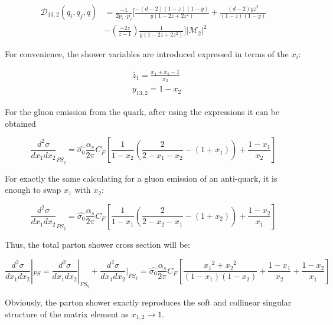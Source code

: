 \begin{equation}
\begin{split}
\mathcal{D}_{13,2} (q_i,q_j,q) &= \frac{-1}{2p_i \cdot p_j}[\frac{-(d-2)(1-z)(1-y) }{y(1-2z+2z^2)}+\frac{(d-2)yz^2}{(1-z)(1-y)}\\
&-(\frac{-2z}{z-1}) \frac{1}{y(1-2z+2z^2)}]|\mathcal{M}_{2}|^2
\end{split}
\end{equation}

For convenience, the shower variables are introduced expressed in terms of the $ x_i $:

\begin{equation}
\begin{split}
&\tilde{z_1}=\frac{x_1+x_2-1}{x_2}\\
&y_{13,2} =1-x_2
\end{split}
\end{equation}

For the gluon emission from the quark, after using the expressions it can be obtained \cite{Schumann:2007mg}

\begin{equation}
\frac{d^2 \sigma}{dx_1 dx_2}_{PS_q}= \hat{\sigma_0}
\frac{\alpha_s}{2\pi} C_F [\frac{1}{1-x_2} (\frac{2}{2-x_1-x_2}-(1+x_1))+\frac{1-x_1}{x_2}]
\end{equation}

For exactly the same calculating for a gluon emission of an anti-quark, it is enough to swap $ x_1 $ with $ x_2 $:

\begin{equation}
\frac{d^2 \sigma}{dx_1 dx_2}_{PS_{\bar{q}}}= \hat{\sigma_0}
\frac{\alpha_s}{2\pi} C_F [\frac{1}{1-x_1} (\frac{2}{2-x_2-x_1}-(1+x_2))+\frac{1-x_2}{x_1}]
\end{equation}

Thus, the total parton shower cross section will be:

\begin{equation}
\frac{d^2 \sigma}{dx_1 dx_2}|_{PS}=\frac{d^2 \sigma}{dx_1 dx_2}|_{PS_q}+\frac{d^2 \sigma}{dx_1 dx_2}|_{PS_{\bar{q}}}= \hat{\sigma_0}
\frac{\alpha_s}{2\pi} C_F [\frac{{x_1}^2+{x_2}^2}{(1-x_1)(1-x_2)}+\frac{1-x_1}{x_2}+\frac{1-x_2}{x_1}]
\end{equation}

Obviously, the parton shower exactly reproduces the soft and collinear singular structure of the matrix element as $ x_{1,2} \rightarrow 1 $.